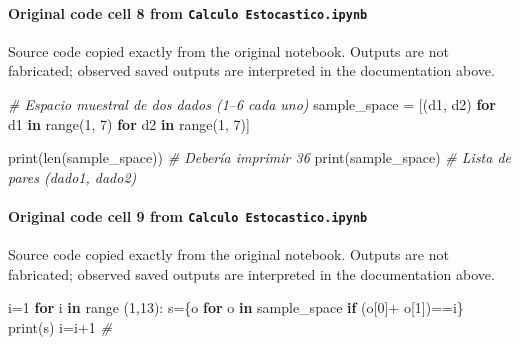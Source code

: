 \documentclass[
  11pt,
]{article}
\newenvironment{Shaded}{}{}
\newcommand{\BuiltInTok}[1]{\textcolor[rgb]{0.00,0.50,0.00}{#1}}
\newcommand{\CommentTok}[1]{\textcolor[rgb]{0.38,0.63,0.69}{\textit{#1}}}
\newcommand{\ControlFlowTok}[1]{\textcolor[rgb]{0.00,0.44,0.13}{\textbf{#1}}}
\newcommand{\DecValTok}[1]{\textcolor[rgb]{0.25,0.63,0.44}{#1}}
\newcommand{\KeywordTok}[1]{\textcolor[rgb]{0.00,0.44,0.13}{\textbf{#1}}}
\newcommand{\NormalTok}[1]{#1}
\newcommand{\OperatorTok}[1]{\textcolor[rgb]{0.40,0.40,0.40}{#1}}
\begin{document}
\paragraph{\texorpdfstring{Original code cell 8 from \texttt{Calculo\ Estocastico.ipynb}}{Original code cell 8 from Calculo Estocastico.ipynb}}\label{original-code-cell-8-from-calculo-estocasticoipynb}

Source code copied exactly from the original notebook. Outputs are not fabricated; observed saved outputs are interpreted in the documentation above.

\begin{Shaded}
\begin{Highlighting}[]
\CommentTok{\# Espacio muestral de dos dados (1–6 cada uno)}
\NormalTok{sample\_space }\OperatorTok{=}\NormalTok{ [(d1, d2) }\ControlFlowTok{for}\NormalTok{ d1 }\KeywordTok{in} \BuiltInTok{range}\NormalTok{(}\DecValTok{1}\NormalTok{, }\DecValTok{7}\NormalTok{) }\ControlFlowTok{for}\NormalTok{ d2 }\KeywordTok{in} \BuiltInTok{range}\NormalTok{(}\DecValTok{1}\NormalTok{, }\DecValTok{7}\NormalTok{)]}

\BuiltInTok{print}\NormalTok{(}\BuiltInTok{len}\NormalTok{(sample\_space))  }\CommentTok{\# Debería imprimir 36}
\BuiltInTok{print}\NormalTok{(sample\_space)       }\CommentTok{\# Lista de pares (dado1, dado2)}
\end{Highlighting}
\end{Shaded}

\paragraph{\texorpdfstring{Original code cell 9 from \texttt{Calculo\ Estocastico.ipynb}}{Original code cell 9 from Calculo Estocastico.ipynb}}\label{original-code-cell-9-from-calculo-estocasticoipynb}

Source code copied exactly from the original notebook. Outputs are not fabricated; observed saved outputs are interpreted in the documentation above.

\begin{Shaded}
\begin{Highlighting}[]
\NormalTok{i}\OperatorTok{=}\DecValTok{1}
\ControlFlowTok{for}\NormalTok{ i }\KeywordTok{in} \BuiltInTok{range}\NormalTok{ (}\DecValTok{1}\NormalTok{,}\DecValTok{13}\NormalTok{):}
\NormalTok{  s}\OperatorTok{=}\NormalTok{\{o }\ControlFlowTok{for}\NormalTok{ o }\KeywordTok{in}\NormalTok{ sample\_space }\ControlFlowTok{if}\NormalTok{ (o[}\DecValTok{0}\NormalTok{]}\OperatorTok{+}\NormalTok{ o[}\DecValTok{1}\NormalTok{])}\OperatorTok{==}\NormalTok{i\}}
  \BuiltInTok{print}\NormalTok{(s)}
\NormalTok{  i}\OperatorTok{=}\NormalTok{i}\OperatorTok{+}\DecValTok{1}
\CommentTok{\#}
\end{Highlighting}
\end{Shaded}
\end{document}
